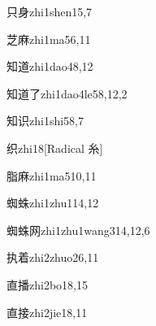 \begin{verbete}{只身}{zhi1shen1}{5,7}
\end{verbete}

\begin{verbete}{芝麻}{zhi1ma5}{6,11}
\end{verbete}

\begin{verbete}{知道}{zhi1dao4}{8,12}
\end{verbete}

\begin{verbete}{知道了}{zhi1dao4le5}{8,12,2}
\end{verbete}

\begin{verbete}{知识}{zhi1shi5}{8,7}
\end{verbete}

\begin{verbete}{织}{zhi1}{8}[Radical 糸]
\end{verbete}

\begin{verbete}{脂麻}{zhi1ma5}{10,11}
\end{verbete}

\begin{verbete}{蜘蛛}{zhi1zhu1}{14,12}
\end{verbete}

\begin{verbete}{蜘蛛网}{zhi1zhu1wang3}{14,12,6}
\end{verbete}

\begin{verbete}{执着}{zhi2zhuo2}{6,11}
\end{verbete}

\begin{verbete}{直播}{zhi2bo1}{8,15}
\end{verbete}

\begin{verbete}{直接}{zhi2jie1}{8,11}
\end{verbete}

